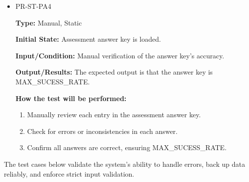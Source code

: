 \documentclass[12pt, titlepage]{article}
\begin{document}
\begin{itemize}
\begin{mdframed}[linewidth=0.5mm]
\begin{enumerate}[noitemsep]
      \end{enumerate}
  \end{mdframed}
  \item PR-ST-PA4
  \begin{mdframed}[linewidth=0.5mm]
      \textbf{Type:} Manual, Static \par
      \textbf{Initial State:} Assessment answer key is loaded. \par
      \textbf{Input/Condition:} Manual verification of the answer key’s accuracy. \par
      \textbf{Output/Results:} The expected output is that the answer key is \\MAX\_SUCESS\_RATE. \par
      \textbf{How the test will be performed:}
      \begin{enumerate}[noitemsep]
        \item Manually review each entry in the assessment answer key.
        \item Check for errors or inconsistencies in each answer.
        \item Confirm all answers are correct, ensuring MAX\_SUCESS\_RATE.
      \end{enumerate}
  \end{mdframed}
\end{itemize}

\hspace{2em}The test cases below validate the system’s ability to handle errors, 
back up data reliably, and enforce strict input validation.
\end{document}
